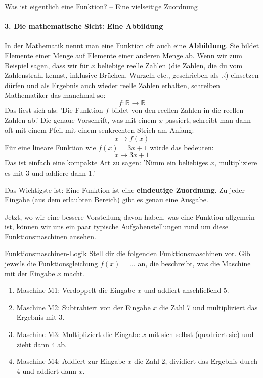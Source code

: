 \begin{infoboxumgebung}{Was ist eigentlich eine Funktion? – Eine vielseitige Zuordnung}
\paragraph{3. Die mathematische Sicht: Eine Abbildung}
In der Mathematik nennt man eine Funktion oft auch eine \textbf{Abbildung}. Sie bildet Elemente einer Menge auf Elemente einer anderen Menge ab.
Wenn wir zum Beispiel sagen, dass wir für $x$ beliebige reelle Zahlen (die Zahlen, die du vom Zahlenstrahl kennst, inklusive Brüchen, Wurzeln etc., geschrieben als $\mathbb{R}$) einsetzen dürfen und als Ergebnis auch wieder reelle Zahlen erhalten, schreiben Mathematiker das manchmal so:
\[ f: \mathbb{R} \to \mathbb{R} \]
Das liest sich als: 'Die Funktion $f$ bildet von den reellen Zahlen in die reellen Zahlen ab.'
Die genaue Vorschrift, was mit einem $x$ passiert, schreibt man dann oft mit einem Pfeil mit einem senkrechten Strich am Anfang:
\[ x \mapsto f(x) \]
Für eine lineare Funktion wie $f(x) = 3x + 1$ würde das bedeuten:
\[ x \mapsto 3x + 1 \]
Das ist einfach eine kompakte Art zu sagen: 'Nimm ein beliebiges $x$, multipliziere es mit 3 und addiere dann 1.'

Das Wichtigste ist: Eine Funktion ist eine \textbf{eindeutige Zuordnung}. Zu jeder Eingabe (aus dem erlaubten Bereich) gibt es genau eine Ausgabe.
\end{infoboxumgebung}

Jetzt, wo wir eine bessere Vorstellung davon haben, was eine Funktion allgemein ist, können wir uns ein paar typische Aufgabenstellungen rund um diese Funktionsmaschinen ansehen.

\begin{aufgabenumgebung}{Funktionsmaschinen-Logik}{}
Stell dir die folgenden Funktionsmaschinen vor. Gib jeweils die Funktionsgleichung $f(x) = \dots$ an, die beschreibt, was die Maschine mit der Eingabe $x$ macht.
\begin{enumerate}
    \item Maschine M1: Verdoppelt die Eingabe $x$ und addiert anschließend 5.
    \item Maschine M2: Subtrahiert von der Eingabe $x$ die Zahl 7 und multipliziert das Ergebnis mit 3.
    \item Maschine M3: Multipliziert die Eingabe $x$ mit sich selbst (quadriert sie) und zieht dann 4 ab.
    \item Maschine M4: Addiert zur Eingabe $x$ die Zahl 2, dividiert das Ergebnis durch 4 und addiert dann $x$.
\end{enumerate}
\end{aufgabenumgebung}

